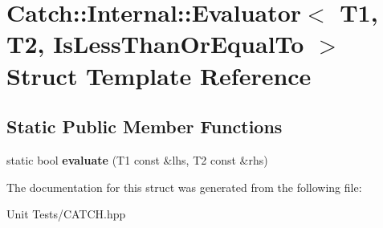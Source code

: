 \hypertarget{structCatch_1_1Internal_1_1Evaluator_3_01T1_00_01T2_00_01IsLessThanOrEqualTo_01_4}{}\section{Catch\+:\+:Internal\+:\+:Evaluator$<$ T1, T2, Is\+Less\+Than\+Or\+Equal\+To $>$ Struct Template Reference}
\label{structCatch_1_1Internal_1_1Evaluator_3_01T1_00_01T2_00_01IsLessThanOrEqualTo_01_4}
\subsection*{Static Public Member Functions}
\begin{DoxyCompactItemize}
\item 
static bool {\bfseries evaluate} (T1 const \&lhs, T2 const \&rhs)\hypertarget{structCatch_1_1Internal_1_1Evaluator_3_01T1_00_01T2_00_01IsLessThanOrEqualTo_01_4_adf269a597e4d82d69f29bcb516297b9b}{}\label{structCatch_1_1Internal_1_1Evaluator_3_01T1_00_01T2_00_01IsLessThanOrEqualTo_01_4_adf269a597e4d82d69f29bcb516297b9b}

\end{DoxyCompactItemize}


The documentation for this struct was generated from the following file\+:\begin{DoxyCompactItemize}
\item 
Unit Tests/C\+A\+T\+C\+H.\+hpp\end{DoxyCompactItemize}
